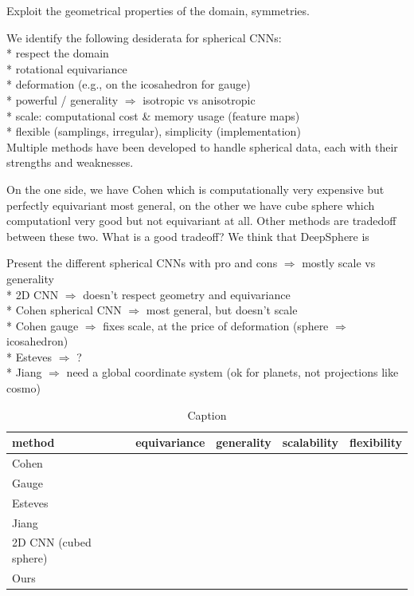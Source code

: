 \documentclass{article} %
\begin{document}
Exploit the geometrical properties of the domain, symmetries.

We identify the following desiderata for spherical CNNs:\\
* respect the domain\\
  * rotational equivariance\\
  * deformation (e.g., on the icosahedron for gauge)\\
* powerful / generality $\Rightarrow$ isotropic vs anisotropic\\
* scale: computational cost \& memory usage (feature maps)\\
* flexible (samplings, irregular), simplicity (implementation)\\

Multiple methods have been developed to handle spherical data, each with their strengths and weaknesses.

On the one side, we have Cohen which is computationally very expensive but perfectly equivariant most general, on the other we have cube sphere which computationl very good but not equivariant at all. Other methods are tradedoff between these two. What is a good tradeoff? We think that DeepSphere is

Present the different spherical CNNs with pro and cons $\Rightarrow$ mostly scale vs generality\\
* 2D CNN $\Rightarrow$ doesn't respect geometry and equivariance\\
* Cohen spherical CNN $\Rightarrow$ most general, but doesn't scale\\
* Cohen gauge $\Rightarrow$ fixes scale, at the price of deformation (sphere $\Rightarrow$ icosahedron)\\
* Esteves $\Rightarrow$ ? \\
* Jiang $\Rightarrow$ need a global coordinate system (ok for planets, not projections like cosmo)\\

\begin{table}[b]
    \centering
    \begin{tabular}{l|c|c|c|c}
         method & equivariance & generality & scalability & flexibility \\
         \hline
        Cohen & & & &  \\
         \hline
        Gauge & & & &  \\
         \hline
        Esteves & & & &  \\
         \hline
        Jiang & & & &  \\
         \hline
        2D CNN (cubed sphere) & & & &  \\
         \hline
        Ours & & & &  \\
    \end{tabular}
    \caption{Caption}
    \label{tab:my_label}
\end{table}
\end{document}
